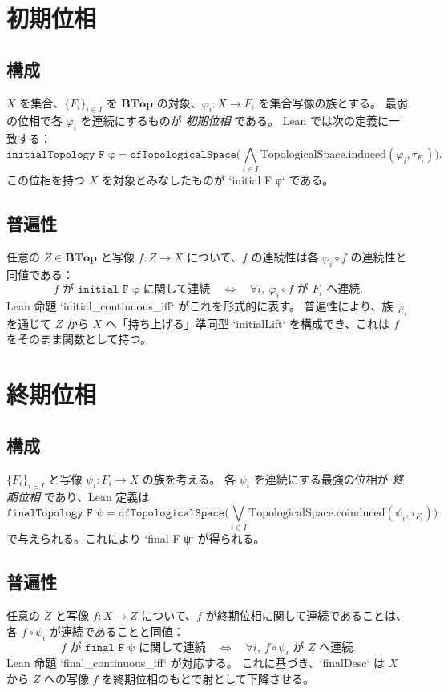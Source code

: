 \documentclass[]{jlreq}
\theoremstyle{definition}
\theoremstyle{remark}
\begin{document}
\section{初期位相}
\subsection{構成}
$X$ を集合、$\{F_i\}_{i\in I}$ を $\mathbf{BTop}$ の対象、$\varphi_i : X \to F_i$ を集合写像の族とする。
最弱の位相で各 $\varphi_i$ を連続にするものが \emph{初期位相} である。
Lean では次の定義に一致する：
\[
\texttt{initialTopology F φ} = \texttt{ofTopologicalSpace}\Big(\bigwedge_{i\in I} \mathrm{TopologicalSpace.induced}(\varphi_i, \tau_{F_i})\Big).
\]
この位相を持つ $X$ を対象とみなしたものが `initial F φ` である。

\subsection{普遍性}
任意の $Z\in\mathbf{BTop}$ と写像 $f : Z \to X$ について、$f$ の連続性は各 $\varphi_i \circ f$ の連続性と同値である：
\[
 f \text{ が }\texttt{initial F φ} \text{ に関して連続}\quad\Longleftrightarrow\quad \forall i,~\varphi_i\circ f \text{ が }F_i\text{ へ連続}.
\]
Lean 命題 `initial_continuous_iff` がこれを形式的に表す。
普遍性により、族 $\varphi_i$ を通じて $Z$ から $X$ へ「持ち上げる」準同型 `initialLift` を構成でき、これは $f$ をそのまま関数として持つ。

\section{終期位相}
\subsection{構成}
$\{F_i\}_{i\in I}$ と写像 $\psi_i : F_i \to X$ の族を考える。
各 $\psi_i$ を連続にする最強の位相が \emph{終期位相} であり、Lean 定義は
\[
\texttt{finalTopology F ψ} = \texttt{ofTopologicalSpace}\Big(\bigvee_{i\in I} \mathrm{TopologicalSpace.coinduced}(\psi_i, \tau_{F_i})\Big)
\]
で与えられる。これにより `final F ψ` が得られる。

\subsection{普遍性}
任意の $Z$ と写像 $f : X \to Z$ について、$f$ が終期位相に関して連続であることは、各 $f\circ\psi_i$ が連続であることと同値：
\[
 f \text{ が }\texttt{final F ψ} \text{ に関して連続}\quad\Longleftrightarrow\quad \forall i,~f\circ\psi_i \text{ が }Z\text{ へ連続}.
\]
Lean 命題 `final_continuous_iff` が対応する。
これに基づき、`finalDesc` は $X$ から $Z$ への写像 $f$ を終期位相のもとで射として下降させる。
\end{document}
